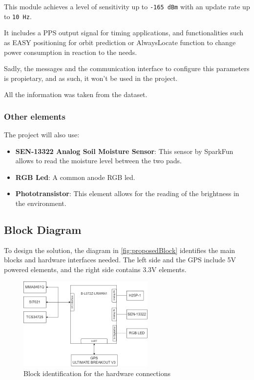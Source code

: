 This module achieves a level of sensitivity up to \texttt{-165 dBm} with an update rate up to \texttt{10 Hz}.

It includes a PPS output signal for timing applications, and functionalities such as EASY positioning for orbit prediction or AlwaysLocate function to change power consumption in reaction to the needs.

Sadly, the messages and the communication interface to configure this parameters is propietary, and as such, it won't be used in the project.

All the information was taken from the dataset\cite{GlobalTopFGPMMOPA6HDatasheetV0A}.

\subsubsection{Other elements}
The project will also use:
\begin{itemize}
    \item \textbf{SEN-13322 Analog Soil Moisture Sensor}\cite{SparkFunSoilMoisture}: This sensor by SparkFun allows to read the moisture level between the two pads.
    \item \textbf{RGB Led}: A common anode RGB led.
    \item \textbf{Phototransistor}\cite{HW5P1_2015__1_}: This element allows for the reading of the brightness in the environment.
\end{itemize}

\clearpage
\subsection{Block Diagram}
To design the solution, the diagram in \autoref{fig:proposedBlock} identifies the main blocks and hardware interfaces needed. The left side and the GPS include 5V powered elements, and the right side contains 3.3V elements.
\begin{figure}[H]
    \centering
    \includegraphics[width=0.6\textwidth]{images/3/General.drawio.png}
    \caption{Block identification for the hardware connections}
    \label{fig:proposedBlock}
\end{figure}


